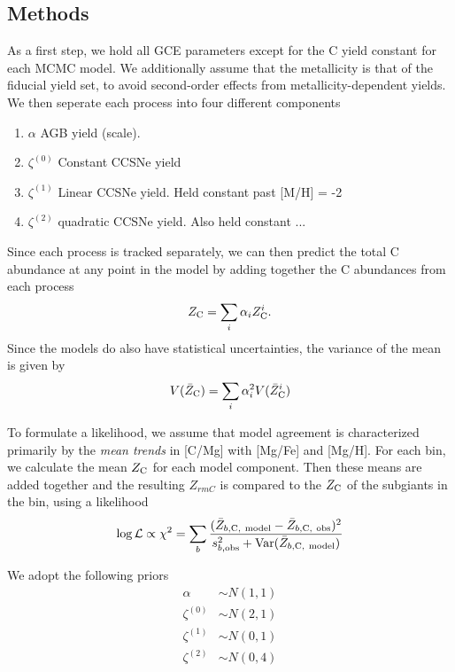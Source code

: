 \documentclass[fleqn,
usenatbib]{mnras}
\newcommand{\zetao}{\zeta^{(0)}}
\newcommand{\zetai}{\zeta^{(1)}}
\newcommand{\zetaii}{\zeta^{(2)}}
\begin{document}
\subsection{Methods}

As a first step, we hold all GCE parameters except for the C yield constant for each MCMC model. We additionally assume that the metallicity is that of the fiducial yield set, to avoid second-order effects from metallicity-dependent yields. We then seperate each process into four different components
\begin{enumerate}
    \item $\alpha$ AGB yield (scale).
    \item $\zetao$ Constant CCSNe yield
    \item $\zetai$ Linear CCSNe yield. Held constant past [M/H] = -2
    \item $\zetaii$ quadratic CCSNe yield. Also held constant ...
\end{enumerate}
Since each process is tracked separately, we can then predict the total C abundance at any point in the model by adding together the C abundances from each process
\begin{equation}
    Z_{\rm C} = \sum_{i} \alpha_i Z_{\rm C}^{i}. 
\end{equation}
Since the models do also have statistical uncertainties, the variance of the mean is given by
\begin{equation}
    V(\bar Z_{\rm C}) = \sum_{i} \alpha_i^2 V(\bar Z_{\rm C}^{i})
\end{equation}


To formulate a likelihood, we assume that model agreement is characterized primarily by the \textit{mean trends} in [C/Mg] with [Mg/Fe] and [Mg/H]. For each bin, we calculate the mean $Z_{\rm C}$ for each model component. Then these means are added together and the resulting $Z_{rm C}$ is compared to the $Z_{\rm C}$ of the subgiants in the bin, using a likelihood
\begin{equation} \label{eq:mcmc_likelihood}
    \log {\cal L} \propto \chi^2 = \sum_b \frac{(\bar Z_{b, \rm C,\ model} - \bar Z_{b, \rm C,\ obs})^2} {s_{b, \rm obs}^2 + {\rm Var}(\bar Z_{b, \rm C,\ model})}
\end{equation}

We adopt the following priors
\begin{subequations}
\begin{align}
    \alpha &\sim N(1, 1) \\
    \zeta^{(0)} &\sim N(2, 1) \\
    \zeta^{(1)} &\sim N(0, 1) \\
    \zeta^{(2)} &\sim N(0, 4) \\
\end{align}
\end{subequations}
\end{document}
